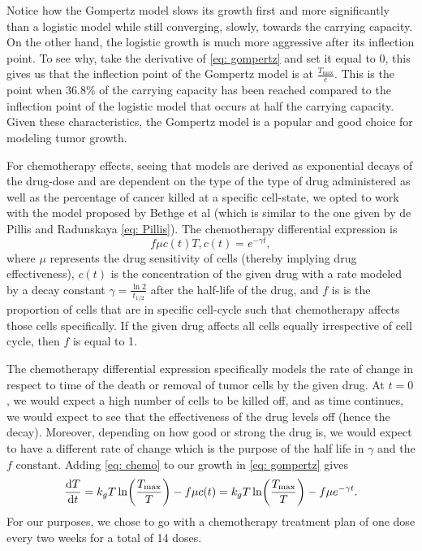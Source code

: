 \documentclass[11pt]{amsart}
\begin{document}
Notice how the Gompertz model slows its growth first and more significantly than a logistic model while still converging, slowly, towards the carrying capacity.
On the other hand, the logistic growth is much more aggressive after its inflection point.
To see why, take the derivative of \eqref{eq: gompertz} and set it equal to 0, this gives us that  the inflection point of the Gompertz model is at $\frac{T_{\max}}{e}$.
This is the point when 36.8\% of the carrying capacity has been reached compared to the inflection point of the logistic model that occurs at half the carrying capacity.
Given these characteristics, the Gompertz model is a popular and good choice for modeling tumor growth.

For chemotherapy effects, seeing that models are derived as exponential decays of the drug-dose and are dependent on the type of the type of drug administered as well as the percentage of cancer killed at a specific cell-state, we opted to work with the model proposed by Bethge et al (which is similar to the one given by de Pillis and Radunskaya \eqref{eq: Pillis}). The chemotherapy differential expression is 
\begin{equation}
	f \mu c(t) T, c(t) = e^{-\gamma t} \label{eq: chemo},
\end{equation}
where $\mu$ represents the drug sensitivity of cells (thereby implying drug effectiveness), $c(t)$ is the concentration of the given drug with a rate modeled by a decay constant $\gamma=\frac{\ln{2}}{t_{1/2}}$ after the half-life of the drug, and $f$ is is the proportion of cells that are in specific cell-cycle such that chemotherapy affects those cells specifically.
If the given drug affects all cells equally irrespective of cell cycle, then $f$ is equal to 1.

The chemotherapy differential expression specifically models the rate of change in respect to time of the death or removal of tumor cells by the given drug.
At $t=0$, we would expect a high number of cells to be killed off, and as time continues, we would expect to see that the effectiveness of the drug levels off (hence the decay).
Moreover, depending on how good or strong the drug is, we would expect to have a different rate of change which is the purpose of the half life in $\gamma$ and the $f$ constant.
Adding \eqref{eq: chemo} to our growth in \eqref{eq: gompertz} gives 
\begin{equation}
	\frac{\mathop{}\!\mathrm{d} T}{\mathop{}\!\mathrm{d} t} = k_g T \ln \biggl(\frac{T_{\max}}{T} \biggr) - f \mu c(t) =k_g T \ln \biggl(\frac{T_{\max}}{T} \biggr) - f \mu e^{-\gamma t} \label{eq: gompertz-chemo}.
\end{equation}
For our purposes, we chose to go with a chemotherapy treatment plan of one dose every two weeks for a total of 14 doses. 
\end{document}
